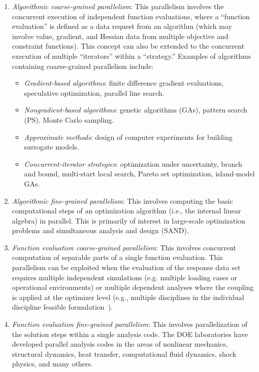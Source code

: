 \begin{enumerate}
\item \emph{Algorithmic coarse-grained parallelism}: This parallelism
  involves the concurrent execution of independent function
  evaluations, where a ``function evaluation'' is defined as a data
  request from an algorithm (which may involve value, gradient, and
  Hessian data from multiple objective and constraint functions). This
  concept can also be extended to the concurrent execution of multiple
  ``iterators'' within a ``strategy.'' Examples of algorithms
  containing coarse-grained parallelism include:
  \begin{itemize}
  \item \emph{Gradient-based algorithms}: finite difference gradient
    evaluations, speculative optimization, parallel line search.

  \item \emph{Nongradient-based algorithms}: genetic algorithms (GAs),
    pattern search (PS), Monte Carlo sampling.

  \item \emph{Approximate methods}: design of computer experiments for
    building surrogate models.

  \item \emph{Concurrent-iterator strategies}: optimization under
    uncertainty, branch and bound, multi-start local search, Pareto
    set optimization, island-model GAs.
  \end{itemize}

\item \emph{Algorithmic fine-grained parallelism}: This involves
  computing the basic computational steps of an optimization algorithm
  (i.e., the internal linear algebra) in parallel. This is primarily
  of interest in large-scale optimization problems and simultaneous
  analysis and design (SAND).

\item \emph{Function evaluation coarse-grained parallelism}: This
  involves concurrent computation of separable parts of a single
  function evaluation. This parallelism can be exploited when the
  evaluation of the response data set requires multiple independent
  simulations (e.g. multiple loading cases or operational
  environments) or multiple dependent analyses where the coupling is
  applied at the optimizer level (e.g., multiple disciplines in the
  individual discipline feasible formulation~\cite{Den94a}).

\item \emph{Function evaluation fine-grained parallelism}: This
  involves parallelization of the solution steps within a single
  analysis code.  The DOE laboratories have developed parallel
  analysis codes in the areas of nonlinear mechanics, structural
  dynamics, heat transfer, computational fluid dynamics, shock
  physics, and many others.
\end{enumerate}

